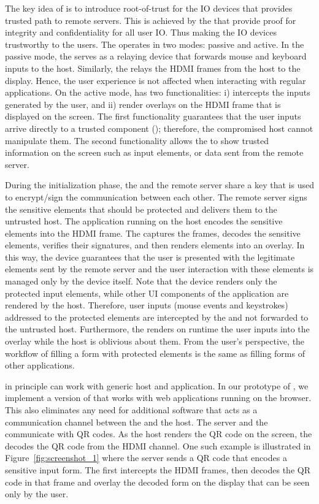  The key idea of \name is to introduce root-of-trust for the IO devices that provides trusted path to remote servers. This is achieved by the \device that provide proof for integrity and confidentiality for all user IO. Thus making the IO devices trustworthy to the users. The \device operates in two modes: passive and active. In the passive mode, the \device serves as a relaying device that forwards mouse and keyboard inputs to the host. Similarly, the \device relays the HDMI frames from the host to the display. Hence, the user experience is not affected when interacting with regular applications. On the active mode, \device has two functionalities: i) intercepts the inputs generated by the user, and ii) render overlays on the HDMI frame that is displayed on the screen. 
The first functionality guarantees that the user inputs arrive directly to a trusted component (\device); therefore, the compromised host cannot manipulate them. The second functionality allows the \device to show trusted information on the screen such as input elements, or data sent from the remote server.

During the initialization phase, the \device and the remote server share a key that is used to encrypt/sign the communication between each other. The remote server signs the sensitive elements that should be protected and delivers them to the untrusted host. The application running on the host encodes the sensitive elements into the HDMI frame. The \device captures the frames, decodes the sensitive elements, verifies their signatures, and then renders elements into an overlay. In this way, the device guarantees that the user is presented with the legitimate elements sent by the remote server and the user interaction with these elements is managed only by the device itself. Note that the device renders only the protected input elements, while other UI components of the application are rendered by the host. 
Therefore, user inputs (mouse events and keystrokes) addressed to the protected elements are intercepted by the \device and not forwarded to the untrusted host. Furthermore, the \device renders on runtime the user inputs into the overlay while the host is oblivious about them. From the user's perspective, the workflow of filling a form with protected elements is the same as filling forms of other applications.

 \name in principle can work with generic host and application. In our prototype of \name, we implement a version of \name that works with web applications running on the browser. This also eliminates any need for additional software that acts as a communication channel between the \device and the host. The server and the \device communicate with QR codes. As the host renders the QR code on the screen, the \device decodes the QR code from the HDMI channel. One such example is illustrated in Figure~\ref{fig:screenshot_1} where the server sends a QR code that encodes a sensitive input form. The \device first intercepts the HDMI frames, then decodes the QR code in that frame and overlay the decoded form on the display that can be seen only by the user. 

